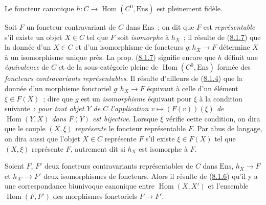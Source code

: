 \begin{proposition}[8.1.7]
\label{0.8.1.7-fr}
Le foncteur canonique
$h:C\to\operatorname{Hom}(C^0,\mathrm{Ens})$ est pleinement fidèle.
\end{proposition}

\begin{env}[8.1.8]
\label{0.8.1.8-fr}
Soit $F$ un foncteur contravariant de $C$ dans $\mathrm{Ens}$~; on dit que
$F$ est \emph{représentable} s'il existe un objet $X\in C$ tel que $F$ soit
\emph{isomorphe} à $h_X$~; il résulte de
(\hyperref[0.8.1.7-fr]{8.1.7}) que la donnée d'un $X\in C$ et d'un
isomorphisme de foncteurs $g:h_X\to F$ détermine $X$ à un isomorphisme
unique près. La prop. (\hyperref[0.8.1.7-fr]{8.1.7}) signifie encore que $h$
définit une \emph{équivalence} de $C$ et de la sous-catégorie pleine de
$\operatorname{Hom}(C^0,\mathrm{Ens})$ formée des \emph{foncteurs
contravariants représentables}. Il résulte d'ailleurs de
(\hyperref[0.8.1.4-fr]{8.1.4}) que la donnée d'un morphisme fonctoriel
$g:h_X\to F$ équivaut à celle d'un élément $\xi\in F(X)$~; dire que $g$ est
un \emph{isomorphisme} équivaut pour $\xi$ à la condition suivante~:
\emph{pour tout objet $Y$ de $C$ l'application
$v\mapsto(F(v))(\xi)$ de $\operatorname{Hom}(Y,X)$ dans $F(Y)$ est
bijective}. Lorsque $\xi$ vérifie cette condition, on dira que le couple
$(X,\xi)$ \emph{représente} le foncteur représentable $F$. Par abus de
langage, on dira aussi que l'objet $X\in C$ représente $F$ s'il existe
$\xi\in F(X)$ tel que $(X,\xi)$ représente $F$, autrement dit si $h_X$ est
isomorphe à $F$.

Soient $F$, $F'$ deux foncteurs contravariants représentables de $C$ dans
$\mathrm{Ens}$, $h_X\to F$ et $h_{X'}\to F'$ deux isomorphismes de
foncteurs. Alors il résulte de (\hyperref[0.8.1.6-fr]{8.1.6}) qu'il y a une
correspondance biunivoque canonique entre $\operatorname{Hom}(X,X')$ et
l'ensemble $\operatorname{Hom}(F,F')$ des morphismes fonctoriels $F\to F'$.
\end{env}

